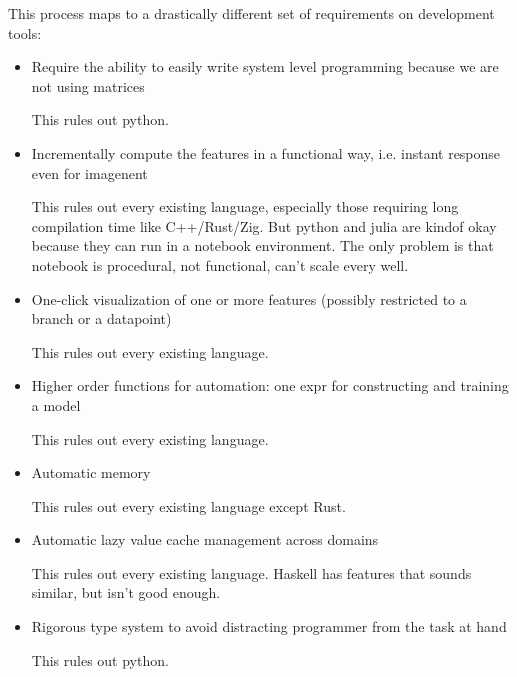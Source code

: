 \documentclass[11pt, oneside]{article}   	%
\theoremstyle{definition}
\begin{document}
This process maps to a drastically different set of requirements on development tools:
\begin{itemize}
	\item Require the ability to easily write system level programming because we are not using matrices

	\begin{rmk}
		This rules out python.
	\end{rmk}
	\item Incrementally compute the features in a functional way, i.e. instant response even for imagenent

	\begin{rmk}
		This rules out every existing language, especially those requiring long compilation time like C++/Rust/Zig. But python and julia are kindof okay because they can run in a notebook environment. The only problem is that notebook is procedural, not functional, can't scale every well.
	\end{rmk}
	\item One-click visualization of one or more features (possibly restricted to a branch or a datapoint)

	\begin{rmk}
		This rules out every existing language.
	\end{rmk}
	\item Higher order functions for automation: one expr for constructing and training a model

	\begin{rmk}
		This rules out every existing language.
	\end{rmk}
	\item Automatic memory

	\begin{rmk}
		This rules out every existing language except Rust.
	\end{rmk}
	\item Automatic lazy value cache management across domains

	\begin{rmk}
		This rules out every existing language. Haskell has features that sounds similar, but isn't good enough.
	\end{rmk}
	\item Rigorous type system to avoid distracting programmer from the task at hand

	\begin{rmk}
		This rules out python.
	\end{rmk}
\end{itemize}
\end{document}
